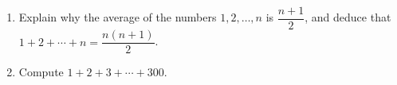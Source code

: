 \begin{enumerate}
\item[(a)] Explain why the average of the numbers $1,2,\dots,n$ is $\dfrac{n+1}{2}$, and deduce that $1+2+\cdots+n=\dfrac{n(n+1)}{2}$.
\item[(b)] Compute $1+2+3+\cdots+300$.
\end{enumerate}
